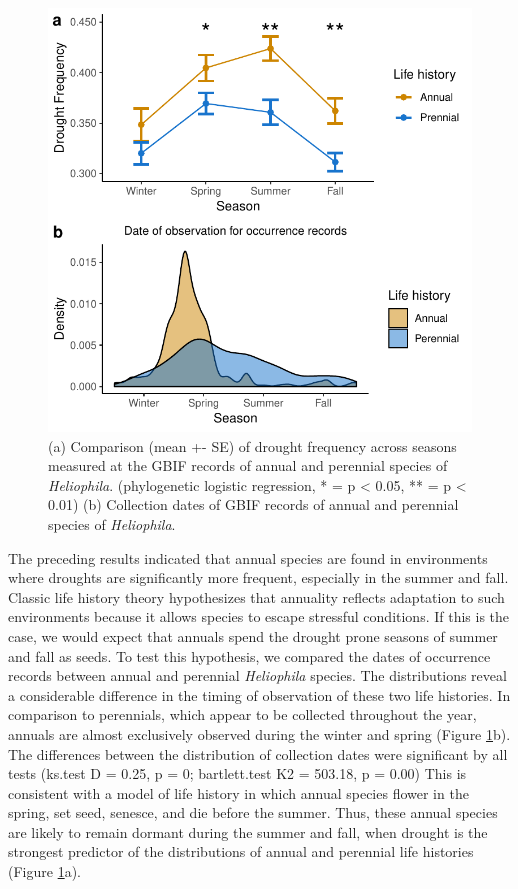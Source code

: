 \documentclass[man,floatsintext]{apa6}
\theoremstyle{definition}
\theoremstyle{definition}
\theoremstyle{definition}
\theoremstyle{remark}
\begin{document}
\begin{figure}[!h]
\includegraphics[width=\textwidth]{../figures/line_and_dates} \caption{(a) Comparison (mean +- SE) of drought frequency across
seasons measured at the GBIF records of annual and perennial species of
\emph{Heliophila}. (phylogenetic logistic regression, * = p \textless{}
0.05, ** = p \textless{} 0.01) (b) Collection dates of GBIF records of
annual and perennial species of \emph{Heliophila}.}\label{fig:lineplots}
\end{figure}

The preceding results indicated that annual species are found in
environments where droughts are significantly more frequent, especially
in the summer and fall. Classic life history theory hypothesizes that
annuality reflects adaptation to such environments because it allows
species to escape stressful conditions. If this is the case, we would
expect that annuals spend the drought prone seasons of summer and fall
as seeds. To test this hypothesis, we compared the dates of occurrence
records between annual and perennial \emph{Heliophila} species. The
distributions reveal a considerable difference in the timing of
observation of these two life histories. In comparison to perennials,
which appear to be collected throughout the year, annuals are almost
exclusively observed during the winter and spring (Figure
\ref{fig:lineplots}b). The differences between the distribution of
collection dates were significant by all tests (ks.test D = 0.25, p = 0;
bartlett.test K2 = 503.18, p = 0.00) This is consistent with a model of
life history in which annual species flower in the spring, set seed,
senesce, and die before the summer. Thus, these annual species are
likely to remain dormant during the summer and fall, when drought is the
strongest predictor of the distributions of annual and perennial life
histories (Figure \ref{fig:lineplots}a).
\end{document}
